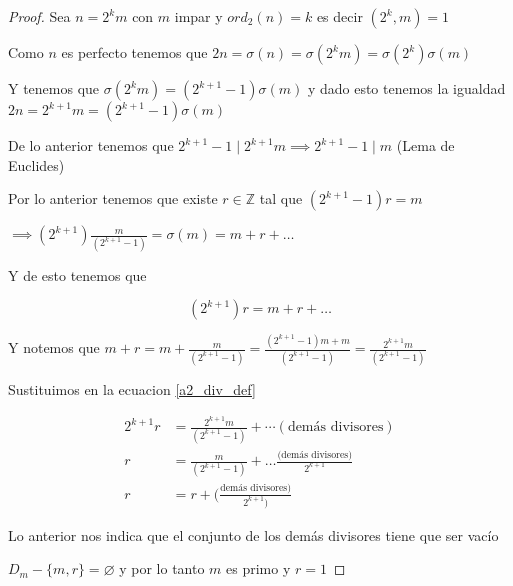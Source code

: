 \documentclass[12pt]{article}
\begin{document}
\begin{enumerate}
\begin{itemize}
            \begin{proof}
            
                Sea $n = 2^km$ con $m$ impar y $ord_2(n) = k$ es decir $(2^k, m) =1$
                
                Como $n$ es perfecto tenemos que $ 2n = \sigma(n) = \sigma(2^k m) = \sigma(2^k) \sigma(m) $
                
                Y tenemos que $\sigma(2^km) = (2^{k+1} - 1) \sigma(m)$ y dado esto tenemos la igualdad $2n = 2^{k+1}m = (2^{k+1} - 1) \sigma(m)$
                
                De lo anterior tenemos que $2^{k+1} - 1 \mid 2^{k+1} m \implies 2^{k+1} - 1 \mid m$ (Lema de Euclides)
                
                Por lo anterior tenemos que existe $r \in \mathbb{Z}$ tal que $(2^{k+1} - 1)r = m$
                
                $\implies (2^{k+1}) \frac{m}{(2^{k+1} - 1)} = \sigma(m) = m + r + \dots$
            
                Y de esto tenemos que 
                
                \begin{equation} \label{a2_div_def}
                    (2^{k+1}) r = m + r + \dots
                \end{equation}
            
               Y notemos que $m + r = m + \frac{m}{(2^{k+1} - 1)} = \frac{(2^{k+1} - 1)m + m}{(2^{k+1} - 1)} = \frac{2^{k+1} m}{(2^{k+1} - 1)}$
               
               
               Sustituimos en la ecuacion \ref{a2_div_def}
               
               \begin{align*}
                   2^{k+1}r &= \frac{2^{k+1} m}{(2^{k+1} - 1)} + \cdots (\text{demás divisores}) \\
                   r &= \frac{m}{(2^{k+1} - 1)} + \dots \frac{(\text{demás divisores)}}{2^{k+1}} \\
                   r &= r + (\frac{\text{demás divisores})}{2^{k+1})}
                \end{align*}
                
                
                Lo anterior nos indica que el conjunto de los demás divisores tiene que ser vacío
                
                $D_m - \{m,r\} = \varnothing$  y por lo tanto $m$ es primo y $r = 1$
                

\end{proof}
\end{itemize}
\end{enumerate}
\end{document}
